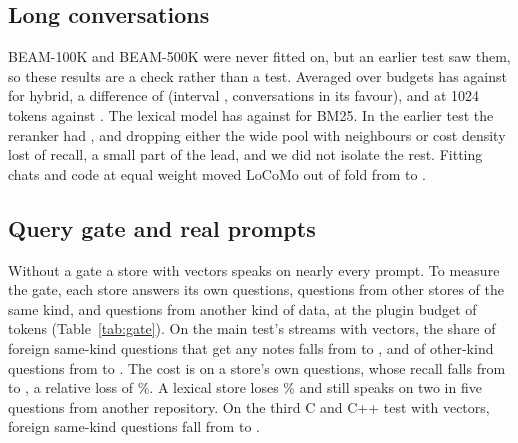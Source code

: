 \begin{table}[!htb]\centering\scriptsize
\caption{Main test: staleness on queries whose fact changed, at $B=1024$.}\label{tab:finalstale}
\resizebox{\columnwidth}{!}{}
\end{table}

\subsection{Long conversations}\label{sec:beamcheck}
BEAM-100K and BEAM-500K were never fitted on, but an earlier test saw them, so these results are a check rather than a test. Averaged over budgets \kanerva has  against  for hybrid, a difference of  (interval ,  conversations in its favour), and at 1024 tokens  against . The lexical model has  against  for BM25. In the earlier test the reranker had , and dropping either the wide pool with neighbours or cost density lost  of recall, a small part of the lead, and we did not isolate the rest. Fitting chats and code at equal weight moved LoCoMo out of fold from  to .

\subsection{Query gate and real prompts}\label{sec:gate}
Without a gate a store with vectors speaks on nearly every prompt. To measure the gate, each store answers its own questions, questions from other stores of the same kind, and questions from another kind of data, at the plugin budget of  tokens (Table~\ref{tab:gate}). On the main test's streams with vectors, the share of foreign same-kind questions that get any notes falls from  to , and of other-kind questions from  to . The cost is on a store's own questions, whose recall falls from  to , a relative loss of \%. A lexical store loses \% and still speaks on two in five questions from another repository. On the third C and C++ test with vectors, foreign same-kind questions fall from  to .

